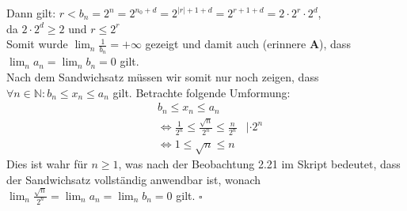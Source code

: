 \documentclass[12pt, a4paper]{article}
\newcommand*{\qed}{\null\nobreak\hfill\ensuremath{\square}}
\begin{document}
Dann gilt: $r < b_n = 2^{n} = 2^{n_0 + d} = 2^{|r| + 1 + d} = 2^{r + 1 + d} = 2 \cdot 2^r \cdot 2^d$, \\
da $2 \cdot 2^d \ge 2$ und $r \le 2^r$ \\
Somit wurde $\lim_{n}\frac{1}{b_n} = +\infty$ gezeigt und damit auch (erinnere \textbf{A}), dass $\lim_{n}a_n = \lim_{n}b_n = 0$ gilt.\\
Nach dem Sandwichsatz müssen wir somit nur noch zeigen, dass \\
$\forall n \in \mathbb N: b_n \le x_n \le a_n$ gilt. Betrachte folgende Umformung:
\vspace{-0.5cm}
\begin{align*}
    & b_n \le x_n \le a_n & \\
    & \Longleftrightarrow \frac{1}{2^n} \le \frac{\sqrt{n}}{2^n} \le \frac{n}{2^n} &| \cdot 2^n \\
    & \Longleftrightarrow 1 \le \sqrt{n} \le n &
\end{align*}
Dies ist wahr für $n \ge 1$, was nach der Beobachtung 2.21 im Skript bedeutet, dass der Sandwichsatz vollständig anwendbar ist, wonach \\
$\lim_{n}\frac{\sqrt{n}}{2^n} = \lim_{n}a_n = \lim_{n}b_n = 0$ gilt. \qed \\
\end{document}
